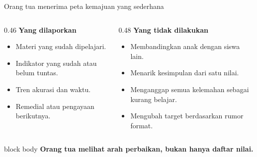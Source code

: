 \begin{frame}[shrink=6]{Orang tua menerima peta kemajuan yang sederhana}
  \begin{columns}[T,onlytextwidth]
    \begin{column}{0.46\textwidth}
      {\color{StudentBlue}\bfseries Yang dilaporkan}\par
      \begin{itemize}
        \item Materi yang sudah dipelajari.
        \item Indikator yang sudah atau belum tuntas.
        \item Tren akurasi dan waktu.
        \item Remedial atau pengayaan berikutnya.
      \end{itemize}
    \end{column}
    \begin{column}{0.48\textwidth}
      {\color{StudentBlue}\bfseries Yang tidak dilakukan}\par
      \begin{itemize}
        \item Membandingkan anak dengan siswa lain.
        \item Menarik kesimpulan dari satu nilai.
        \item Menganggap semua kelemahan sebagai kurang belajar.
        \item Mengubah target berdasarkan rumor format.
      \end{itemize}
    \end{column}
  \end{columns}
  \vspace{0.16cm}
  \begin{beamercolorbox}[rounded=true,sep=0.18cm,wd=\textwidth]{block body}
    \centering\bfseries Orang tua melihat arah perbaikan, bukan hanya daftar nilai.
  \end{beamercolorbox}
\end{frame}

